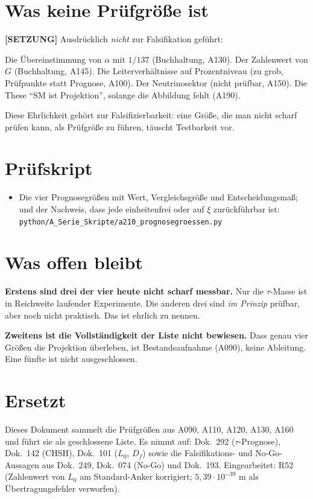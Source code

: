 \section{Was keine Prüfgröße ist}

\textbf{[SETZUNG]} Ausdrücklich \emph{nicht} zur Falsifikation geführt:

Die Übereinstimmung von $\alpha$ mit $1/137$ (Buchhaltung, A130). Der Zahlenwert
von $G$ (Buchhaltung, A145). Die Leiterverhältnisse auf Prozentniveau (zu grob,
Prüfpunkte statt Prognose, A100). Der Neutrinosektor (nicht prüfbar, A150). Die
These \enquote{SM ist Projektion}, solange die Abbildung fehlt (A190).

Diese Ehrlichkeit gehört zur Falsifizierbarkeit: eine Größe, die man nicht
scharf prüfen kann, als Prüfgröße zu führen, täuscht Testbarkeit vor.

\section{Prüfskript}

\begin{itemize}
  \item Die vier Prognosegrößen mit Wert, Vergleichsgröße und Entscheidungsmaß;
    und der Nachweis, dass jede einheitenfrei oder auf $\xi$ zurückführbar ist:
    \texttt{python/A\_Serie\_Skripte/a210\_prognosegroessen.py}
\end{itemize}

\section{Was offen bleibt}

\textbf{Erstens sind drei der vier heute nicht scharf messbar.} Nur die
$\tau$-Masse ist in Reichweite laufender Experimente. Die anderen drei sind
\emph{im Prinzip} prüfbar, aber noch nicht praktisch. Das ist ehrlich zu nennen.

\textbf{Zweitens ist die Vollständigkeit der Liste nicht bewiesen.} Dass genau
vier Größen die Projektion überleben, ist Bestandsaufnahme (A090), keine
Ableitung. Eine fünfte ist nicht ausgeschlossen.

\section{Ersetzt}

Dieses Dokument sammelt die Prüfgrößen aus A090, A110, A120, A130, A160 und
führt sie als geschlossene Liste. Es nimmt auf: Dok.~292 ($\tau$-Prognose),
Dok.~142 (CHSH), Dok.~101 ($L_0$, $D_f$) sowie die Falsifikations- und
No-Go-Aussagen aus Dok.~249, Dok.~074 (No-Go) und Dok.~193. Eingearbeitet:
R52 (Zahlenwert von $L_0$ am Standard-Anker korrigiert; $5{,}39\cdot10^{-39}$ m
als Übertragungsfehler verworfen).

